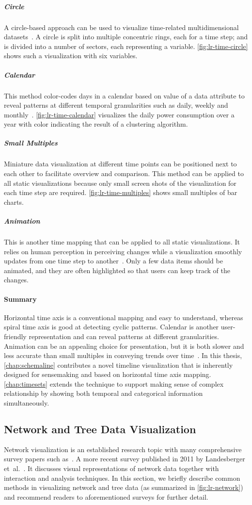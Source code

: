 \subparagraph{Circle} A circle-based approach can be used to visualize time-related multidimensional datasets~\cite{Keim2004}. A circle is split into multiple concentric rings, each for a time step; and is divided into a number of sectors, each representing a variable. \autoref{fig:lr-time-circle} shows such a visualization with six variables.

\subparagraph{Calendar} This method color-codes days in a calendar based on value of a data attribute to reveal patterns at different temporal granularities such as daily, weekly and monthly~\cite{VanWijk1999}. \autoref{fig:lr-time-calendar} visualizes the daily power consumption over a year with color indicating the result of a clustering algorithm.

\subparagraph{Small Multiples}  Miniature data visualization at different time points can be positioned next to each other to facilitate overview and comparison. This method can be applied to all static visualizations because only small screen shots of the visualization for each time step are required. \autoref{fig:lr-time-multiples} shows small multiples of bar charts.

\subparagraph{Animation} This is another time mapping that can be applied to all static visualizations. It relies on human perception in perceiving changes while a visualization smoothly updates from one time step to another~\cite{Gapminder}. Only a few data items should be animated, and they are often highlighted so that users can keep track of the changes. 

\paragraph{Summary} Horizontal time axis is a conventional mapping and easy to understand, whereas spiral time axis is good at detecting cyclic patterns. Calendar is another user-friendly representation and can reveal patterns at different granularities. Animation can be an appealing choice for presentation, but it is both slower and less accurate than small multiples in conveying trends over time~\cite{Robertson2008}. In this thesis, \autoref{chap:schemaline} contributes a novel timeline visualization that is inherently designed for sensemaking and based on horizontal time axis mapping. \autoref{chap:timesets} extends the technique to support making sense of complex relationship by showing both temporal and categorical information simultaneously.

\subsection{Network and Tree Data Visualization}
Network visualization is an established research topic with many comprehensive survey papers such as~\cite{Herman2000}. A more recent survey published in 2011 by Landesberger et~al.~\cite{Landesberger2011}. It discusses visual representations of network data together with interaction and analysis techniques. In this section, we briefly describe common methods in visualizing network and tree data (as summarized in \autoref{fig:lr-network}) and recommend readers to aforementioned surveys for further detail. 

